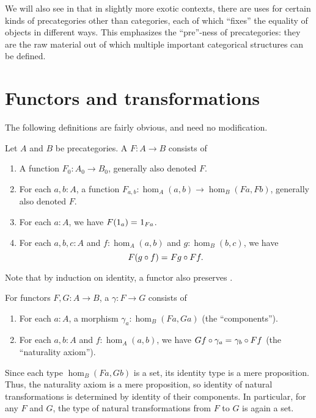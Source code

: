 We will also see in  that in slightly more exotic contexts, there are uses for certain kinds of precategories other than categories, each of which ``fixes'' the equality of objects in different ways.
This emphasizes the ``pre''-ness of precategories: they are the raw material out of which multiple important categorical structures can be defined.


\section{Functors and transformations}
\label{sec:transfors}

The following definitions are fairly obvious, and need no modification.

\begin{defn}\label{ct:functor}
  Let $A$ and $B$ be precategories.
  A  $F:A\to B$ consists of
  \begin{enumerate}
  \item A function $F_0:A_0\to B_0$, generally also denoted $F$.
  \item For each $a,b:A$, a function $F_{a,b}:\hom_A(a,b) \to \hom_B(Fa,Fb)$, generally also denoted $F$.
  \item For each $a:A$, we have $F(1_a) =_{} 1_{Fa}$.
  \item For each $a,b,c:A$ and $f:\hom_A(a,b)$ and $g:\hom_B(b,c)$, we have
    \[F(g\circ f) =_{} Fg\circ Ff.\]
  \end{enumerate}
\end{defn}

Note that by induction on identity, a functor also preserves \idtoiso.

\begin{defn}\label{ct:nattrans}
  For functors $F,G:A\to B$, a  $\gamma:F\to G$ consists of
  \begin{enumerate}
  \item For each $a:A$, a morphism $\gamma_a:\hom_B(Fa,Ga)$ (the ``components'').
  \item For each $a,b:A$ and $f:\hom_A(a,b)$, we have $Gf\circ \gamma_a =_{} \gamma_b\circ Ff$ (the ``naturality axiom'').
  \end{enumerate}
\end{defn}

Since each type $\hom_B(Fa,Gb)$ is a set, its identity type is a mere proposition.
Thus, the naturality axiom is a mere proposition, so identity of natural transformations is determined by identity of their components.
In particular, for any $F$ and $G$, the type of natural transformations from $F$ to $G$ is again a set.

